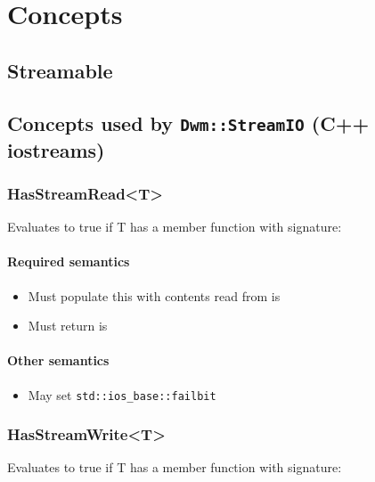 \chapter{Concepts}

\section{Streamable}

\begin{minipage}{\textwidth}
\section{Concepts used by \texttt{Dwm::StreamIO} (C++ iostreams)}
\hypertarget{concept:HasStreamRead}{\subsection{\ttfamily HasStreamRead<T>}}
Evaluates to true if {\ttfamily T} has a member function with signature:


\subsubsection{Required semantics}
\begin{itemize}[noitemsep,nolistsep]
  \item Must populate {\ttfamily *this} with contents read from {\ttfamily is}
  \item Must return {\ttfamily is}
\end{itemize}

\subsubsection{Other semantics}
\begin{itemize}[noitemsep,nolistsep]
  \item May set \texttt{std::ios\_base::failbit}
\end{itemize}

\hypertarget{concept:HasStreamWrite}{\subsection{\ttfamily HasStreamWrite<T>}}
Evaluates to true if {\ttfamily T} has a member function with signature:



\end{minipage}
